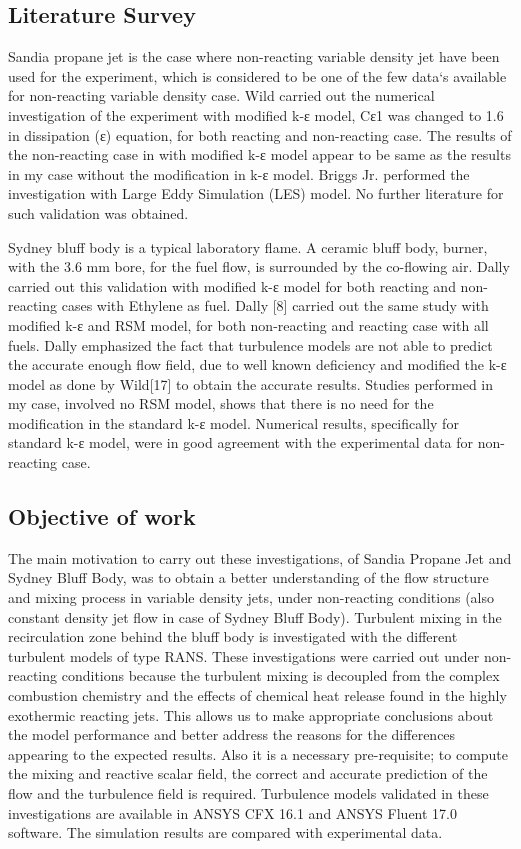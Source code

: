 \documentclass[10pt,a4paper,notitlepage]{article}
\begin{document}
\begin{multicols}{2}
\subsection{Literature Survey}
Sandia propane jet is the case where non-reacting variable density jet have been used for the experiment, which is considered to be one of the few data`s available for non-reacting variable density case. Wild carried out the numerical investigation of the experiment with modified k-ε model, Cε1 was changed to 1.6 in dissipation (ε) equation, for both reacting and non-reacting case. The results of the non-reacting case in with modified k-ε model appear to be same as the results in my case without the modification in k-ε model. Briggs Jr. performed the investigation with Large Eddy Simulation (LES) model. No further literature for such validation was obtained.\par
Sydney bluff body is a typical laboratory flame. A ceramic bluff body, burner, with the 3.6 mm bore, for the fuel flow, is surrounded by the co-flowing air. Dally carried out this validation with modified k-ε model for both reacting and non-reacting cases with Ethylene as fuel. Dally [8] carried out the same study with modified k-ε and RSM model, for both non-reacting and reacting case with all fuels. Dally emphasized the fact that turbulence models are not able to predict the accurate enough flow field, due to well known deficiency and modified the k-ε model as done by Wild[17] to obtain the accurate results. Studies performed in my case, involved no RSM model, shows that there is no need for the modification in the standard k-ε model. Numerical results, specifically for standard k-ε model, were in good agreement with the experimental data for non-reacting case.
\subsection{Objective of work}
The main motivation to carry out these investigations, of Sandia Propane Jet and Sydney Bluff Body, was to obtain a better understanding of the flow structure and mixing process in variable density jets, under non-reacting conditions (also constant density jet flow in case of Sydney Bluff Body). Turbulent mixing in the recirculation zone behind the bluff body is investigated with the different turbulent models of type RANS. These investigations were carried out under non-reacting conditions because the turbulent mixing is decoupled from the complex combustion chemistry and the effects of chemical heat release found in the highly exothermic reacting jets. This allows us to make appropriate conclusions about the model performance and better address the reasons for the differences appearing to the expected results. Also it is a necessary pre-requisite; to compute the mixing and reactive scalar field, the correct and accurate prediction of the flow and the turbulence field is required. Turbulence models validated in these investigations are available in ANSYS CFX 16.1 and ANSYS Fluent 17.0 software. The simulation results are compared with experimental data. 


\end{multicols}
\end{document}
